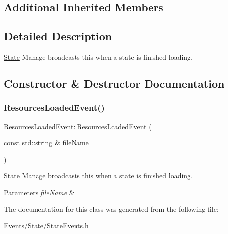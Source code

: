 \subsection*{Additional Inherited Members}


\subsection{Detailed Description}
\hyperlink{classState}{State} Manage broadcasts this when a state is finished loading. 

\subsection{Constructor \& Destructor Documentation}
\mbox{\label{classResourcesLoadedEvent_abc7422721c0b41dee4b5f3687bdc4a6f}} 
\subsubsection{\texorpdfstring{Resources\+Loaded\+Event()}{ResourcesLoadedEvent()}}
{\footnotesize\ttfamily Resources\+Loaded\+Event\+::\+Resources\+Loaded\+Event (\begin{DoxyParamCaption}\item[{const std\+::string \&}]{file\+Name }\end{DoxyParamCaption})\hspace{0.3cm}{\ttfamily [inline]}}



\hyperlink{classState}{State} Manage broadcasts this when a state is finished loading. 


\begin{DoxyParams}{Parameters}
{\em file\+Name} & \\
\hline
\end{DoxyParams}


The documentation for this class was generated from the following file\+:\begin{DoxyCompactItemize}
\item 
Events/\+State/\hyperlink{StateEvents_8h}{State\+Events.\+h}\end{DoxyCompactItemize}

